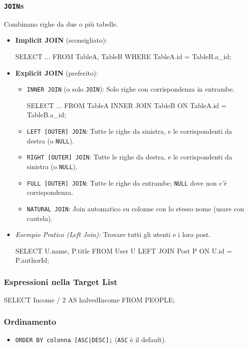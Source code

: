 \documentclass{article}
\begin{document}
	\subsubsection{\texttt{JOIN}s}
	Combinano righe da due o più tabelle.
	\begin{itemize}
		\item \textbf{Implicit JOIN} (sconsigliato):
		\begin{sqlcode}
			SELECT ... FROM TableA, TableB WHERE TableA.id = TableB.a_id;
		\end{sqlcode}
		\item \textbf{Explicit JOIN} (preferito):
		\begin{itemize}
			\item \texttt{INNER JOIN} (o solo \texttt{JOIN}): Solo righe con corrispondenza in entrambe.
			\begin{sqlcode}
				SELECT ... FROM TableA INNER JOIN TableB ON TableA.id = TableB.a_id;
			\end{sqlcode}
			\item \texttt{LEFT [OUTER] JOIN}: Tutte le righe da sinistra, e le corrispondenti da destra (o \texttt{NULL}).
			\item \texttt{RIGHT [OUTER] JOIN}: Tutte le righe da destra, e le corrispondenti da sinistra (o \texttt{NULL}).
			\item \texttt{FULL [OUTER] JOIN}: Tutte le righe da entrambe; \texttt{NULL} dove non c'è corrispondenza.
			\item \texttt{NATURAL JOIN}: Join automatico su colonne con lo stesso nome (usare con cautela).
		\end{itemize}
		\item \textit{Esempio Pratico (Left Join):} Trovare tutti gli utenti e i loro post.
		\begin{sqlcode}
			SELECT U.name, P.title
			FROM User U LEFT JOIN Post P ON U.id = P.authorId;
		\end{sqlcode}
	\end{itemize}
	
	\subsubsection{Espressioni nella Target List}
	\begin{sqlcode}
		SELECT Income / 2 AS halvedIncome FROM PEOPLE;
	\end{sqlcode}
	
	\subsubsection{Ordinamento}
	\begin{itemize}
		\item \texttt{ORDER BY colonna [ASC|DESC];} (\texttt{ASC} è il default).
	\end{itemize}
	
\end{document}
